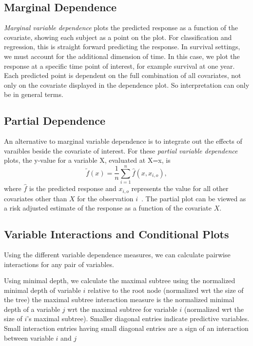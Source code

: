 \documentclass[nojss]{jss}\usepackage[]{graphicx}\usepackage[]{color}
\begin{document}
\subsection{Marginal Dependence}\label{S:variablePlots}
\emph{Marginal variable dependence} plots the predicted response as a function of the covariate, showing each subject as a point on the plot. For classification and regression, this is straight forward predicting the response. In survival settings, we must account for the additional dimension of time. In this case, we plot the response at a specific time point of interest, for example survival at one year. Each predicted point is dependent on the full combination of all covariates, not only on the covariate displayed in the dependence plot. So interpretation can only be in general terms.  


\subsection{Partial Dependence}\label{S:variablePlots}

An alternative to marginal variable dependence is to integrate out the effects of varaibles beside the covariate of interest. For these \emph{partial variable dependence} plots, the y-value for a variable X, evaluated at X=x, is
\[
\tilde{f}(x) = \frac{1}{n} \sum_{i=1}^n \hat{f}(x, x_{i,o}),
\]
where $\hat{f}$ is the predicted response and $x_{i,o}$ represents the value for all other covariates other than $X$ for the observation $i$~\citep{FriedmanGreedyfunction:2000}. The partial plot can be viewed as a risk adjusted estimate of the response as a function of the covariate $X$.



\subsection{Variable Interactions and Conditional Plots}
Using the different variable dependence measures, we can calculate pairwise interactions for any pair of variables. 

Using minimal depth, we calculate the maximal subtree using the normalized minimal depth of variable $i$ relative to the root node (normalized wrt the size of the tree) the maximal subtree interaction measure  is the normalized minimal depth of a variable $j$ wrt the maximal subtree for variable $i$ (normalized wrt the size of $i$'s maximal subtree). Smaller diagonal entries indicate predictive variables. Small interaction entries having small diagonal entries are a sign of an interaction between variable $i$ and $j$~\citep{Ishwaran_HighDimension:2010,Ishwaran_HighDimension:2011} 
\end{document}
